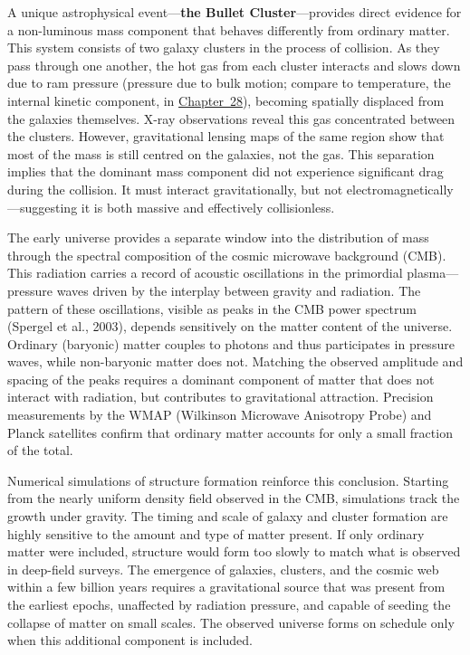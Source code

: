 A unique astrophysical event—\textbf{the Bullet Cluster}—provides direct evidence for a non-luminous mass component that behaves differently from ordinary matter. This system consists of two galaxy clusters in the process of collision. As they pass through one another, the hot gas from each cluster interacts and slows down due to ram pressure (pressure due to bulk motion; compare to temperature, the internal kinetic component, in \hyperref[ch:negativetemperature]{Chapter~28}), becoming spatially displaced from the galaxies themselves. X-ray observations reveal this gas concentrated between the clusters. However, gravitational lensing maps of the same region show that most of the mass is still centred on the galaxies, not the gas. This separation implies that the dominant mass component did not experience significant drag during the collision. It must interact gravitationally, but not electromagnetically—suggesting it is both massive and effectively collisionless.

The early universe provides a separate window into the distribution of mass through the spectral composition of the cosmic microwave background (CMB). This radiation carries a record of acoustic oscillations in the primordial plasma—pressure waves driven by the interplay between gravity and radiation. The pattern of these oscillations, visible as peaks in the CMB power spectrum (Spergel et al., 2003), depends sensitively on the matter content of the universe. Ordinary (baryonic) matter couples to photons and thus participates in pressure waves, while non-baryonic matter does not. Matching the observed amplitude and spacing of the peaks requires a dominant component of matter that does not interact with radiation, but contributes to gravitational attraction. Precision measurements by the WMAP (Wilkinson Microwave Anisotropy Probe) and Planck satellites confirm that ordinary matter accounts for only a small fraction of the total.

Numerical simulations of structure formation reinforce this conclusion. Starting from the nearly uniform density field observed in the CMB, simulations track the growth under gravity. The timing and scale of galaxy and cluster formation are highly sensitive to the amount and type of matter present. If only ordinary matter were included, structure would form too slowly to match what is observed in deep-field surveys. The emergence of galaxies, clusters, and the cosmic web within a few billion years requires a gravitational source that was present from the earliest epochs, unaffected by radiation pressure, and capable of seeding the collapse of matter on small scales. The observed universe forms on schedule only when this additional component is included.

